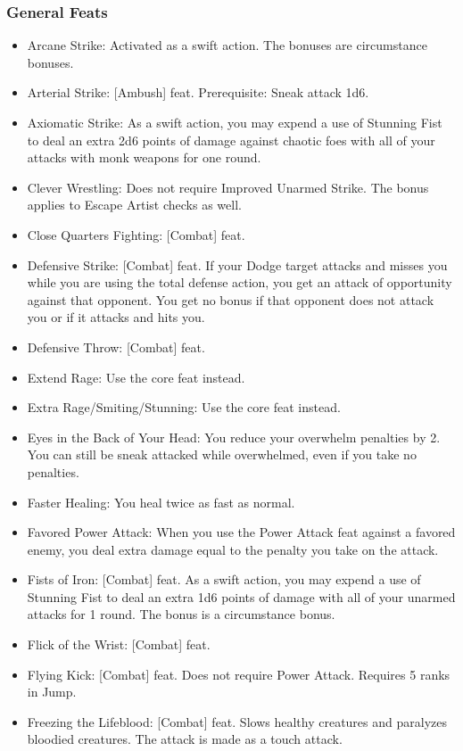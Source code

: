 \subsubsection{General Feats}
\begin{itemize}
\item Arcane Strike: Activated as a swift action. The bonuses are circumstance bonuses.
\item Arterial Strike: [Ambush] feat. Prerequisite: Sneak attack \plus1d6.
\item Axiomatic Strike: As a swift action, you may expend a use of Stunning Fist to deal an extra 2d6 points of damage against chaotic foes with all of your attacks with monk weapons for one round.
\item Clever Wrestling: Does not require Improved Unarmed Strike. The bonus applies to Escape Artist checks as well.
\item Close Quarters Fighting: [Combat] feat.
\item Defensive Strike: [Combat] feat. If your Dodge target attacks and misses you while you are using the total defense action, you get an attack of opportunity against that opponent. You get no bonus if that opponent does not attack you or if it attacks and hits you.
\item Defensive Throw: [Combat] feat.
\item Extend Rage: Use the core feat instead.
\item Extra Rage/Smiting/Stunning: Use the core feat instead.
\item Eyes in the Back of Your Head: You reduce your overwhelm penalties by 2. You can still be sneak attacked while overwhelmed, even if you take no penalties.
\item Faster Healing: You heal twice as fast as normal.
\item Favored Power Attack: When you use the Power Attack feat against a favored enemy, you deal extra damage equal to the penalty you take on the attack.
\item Fists of Iron: [Combat] feat. As a swift action, you may expend a use of Stunning Fist to deal an extra 1d6 points of damage with all of your unarmed attacks for 1 round. The bonus is a circumstance bonus.
\item Flick of the Wrist: [Combat] feat.
\item Flying Kick: [Combat] feat. Does not require Power Attack. Requires 5 ranks in Jump.
\item Freezing the Lifeblood: [Combat] feat. Slows healthy creatures and paralyzes bloodied creatures. The attack is made as a touch attack.

\end{itemize}
